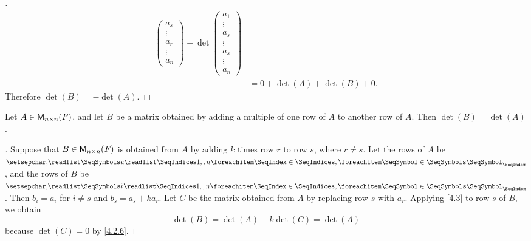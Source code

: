 \begin{proof}[]
\begin{align*}
\begin{pmatrix}
			                                                  a_s    \\
			                                                  \vdots \\
			                                                  a_r    \\
			                                                  \vdots \\
			                                                  a_n
		                                                  \end{pmatrix} + \det\begin{pmatrix}
			                                                                      a_1    \\
			                                                                      \vdots \\
			                                                                      a_s    \\
			                                                                      \vdots \\
			                                                                      a_s    \\
			                                                                      \vdots \\
			                                                                      a_n
		                                                                      \end{pmatrix} \\
		  & = 0 + \det(A) + \det(B) + 0.
	\end{align*}
	Therefore \(\det(B) = -\det(A)\).
\end{proof}

\begin{thm}\label{4.6}
	Let \(A \in \mathsf{M}_{{n} \times n}({\mathit{F}})\), and let \(B\) be a matrix obtained by adding a multiple of one row of \(A\) to another row of \(A\).
	Then \(\det(B) = \det(A)\).
\end{thm}

\begin{proof}[]
	Suppose that \(B \in \mathsf{M}_{{n} \times n}({\mathit{F}})\) is obtained from \(A\) by adding \(k\) times row \(r\) to row \(s\), where \(r \neq s\).
	Let the rows of \(A\) be \(\seq{a}{1,,n}\), and the rows of \(B\) be \(\seq{b}{1,,n}\).
	Then \(b_i = a_i\) for \(i \neq s\) and \(b_s = a_s + k a_r\).
	Let \(C\) be the matrix obtained from \(A\) by replacing row \(s\) with \(a_r\).
	Applying \cref{4.3} to row \(s\) of \(B\), we obtain
	\[
		\det(B) = \det(A) + k \det(C) = \det(A)
	\]
	because \(\det(C) = 0\) by \cref{4.2.6}.
\end{proof}

